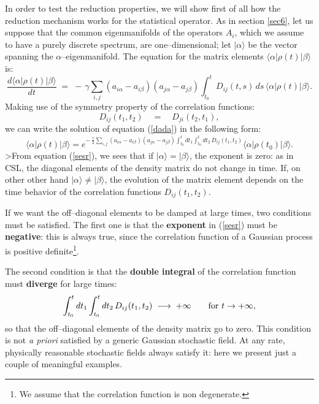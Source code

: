 \documentclass[12pt]{article}
\begin{document}
In order to test the reduction properties, we will show first of
all how the reduction mechanism works for the statistical
operator. As in section \ref{sec6}, let us suppose that the common
eigenmanifolds of the operators $A_{i}$, which we assume to have a
purely discrete spectrum, are one--dimensional; let
$|\alpha\rangle$ be the vector spanning the
$\alpha$--eigenmanifold. The equation for the matrix elements
$\langle\alpha|\rho(t)|\beta\rangle$ is:
\begin{equation} \label{dada}
\frac{d \langle\alpha|\rho(t)|\beta\rangle}{dt} \; = \; - \,
\gamma \sum_{i,j} (a_{i\alpha} - a_{i\beta})(a_{j\alpha} -
a_{j\beta}) \int_{t_{0}}^{t} D_{ij}(t,s)\, ds \,
\langle\alpha|\rho(t)|\beta\rangle.
\end{equation}
Making use of the symmetry property of the correlation functions:
\begin{equation}
D_{ij}(t_{1}, t_{2}) \quad = \quad D_{ji}(t_{2}, t_{1}),
\end{equation}
we can write the solution of equation (\ref{dada}) in the
following form:
\begin{equation} \label{sesr}
\langle\alpha|\rho(t)|\beta\rangle  =  e^{\displaystyle - \,
\frac{\gamma}{2} \sum_{i,j} (a_{i\alpha} - a_{i\beta})(a_{j\alpha}
- a_{j\beta}) \int_{t_{0}}^{t} dt_{1} \int_{t_{0}}^{t} dt_{2}\,
D_{ij}(t_{1},t_{2})} \langle\alpha|\rho(t_{0})|\beta\rangle.
\end{equation}
>From equation (\ref{sesr}), we sees that if $|\alpha\rangle =
|\beta\rangle$, the exponent is zero: as in CSL, the diagonal
elements of the density matrix do not change in time. If, on other
other hand $|\alpha\rangle \neq |\beta\rangle$, the evolution of
the matrix element depends on the time behavior of the correlation
functions $D_{ij}(t_{1},t_{2})$.

If we want the off--diagonal elements to be damped at large times,
two conditions must be satisfied. The first one is that the {\bf
exponent} in (\ref{sesr}) must be {\bf negative}: this is always
true, since the correlation function of a Gaussian process is
positive definite\footnote{We assume that the correlation function
is non degenerate.}.

The second condition is that the {\bf double integral} of the
correlation function must {\bf diverge} for large times:
\begin{equation} \label{cond2}
\int_{t_{0}}^{t} dt_{1} \int_{t_{0}}^{t} dt_{2}\,
D_{ij}(t_{1},t_{2}) \; \longrightarrow \; +\infty \qquad
\makebox{for $t \rightarrow +\infty$},
\end{equation}
so that the off--diagonal elements of the density matrix go to
zero. This condition is not {\it a priori} satisfied by a generic
Gaussian stochastic field. At any rate, physically reasonable
stochastic fields always satisfy it: here we present just a couple
of meaningful examples.
\end{document}
